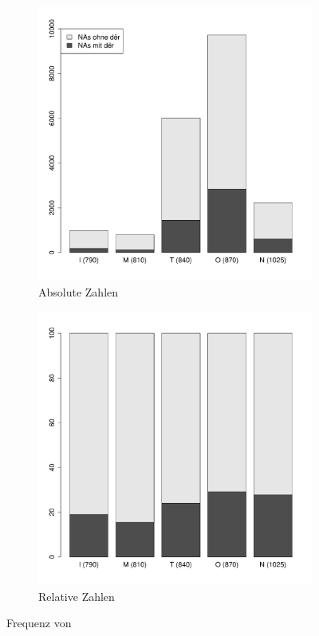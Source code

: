 \begin{figure}
\begin{subfigure}[b]{.5\linewidth}
  \includegraphics[width=7 cm]{generated/images/artikel-anzahl-abs}
\caption {Absolute Zahlen}
\label{fig:art-abs}
\end{subfigure}%
\begin{subfigure}[b]{.5\linewidth}
  \includegraphics[width=7 cm]{generated/images/artikel-anzahl-rel}
\caption {Relative Zahlen}
\label{fig:art-rel}
\end{subfigure}
\caption{Frequenz von }
\label{abb:art-freq}
\end{figure}


